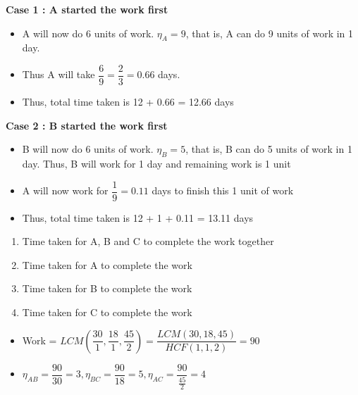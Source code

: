 \begin{multicols}{2}
    
    \textbf{Case 1 : A started the work first}
    \begin{itemize}
        \item A will now do 6 units of work. $\eta_A = 9$, that is, A can do 9 units of work in 1 day. 
        \item Thus A will take $\dfrac{6}{9} = \dfrac{2}{3} = 0.66$ days. 
        \item Thus, total time taken is 12 + 0.66 = 12.66 days
    \end{itemize}
        
    \columnbreak
    
    \textbf{Case 2 : B started the work first}
    \begin{itemize}
        \item B will now do 6 units of work. $\eta_B = 5$, that is, B can do 5 units of work in 1 day. Thus, B will work for 1 day and remaining work is 1 unit
        \item A will now work for $\dfrac{1}{9} = 0.11$ days to finish this 1 unit of work 
        \item Thus, total time taken is 12 + 1 + 0.11 = 13.11 days
    \end{itemize}

\end{multicols}


\begin{enumerate}
    \item Time taken for A, B and C to complete the work together
    \item Time taken for A to complete the work
    \item Time taken for B to complete the work
    \item Time taken for C to complete the work
\end{enumerate}

\vspace{2cm}

\begin{itemize}
    \item Work = $LCM(\dfrac{30}{1}, \dfrac{18}{1}, \dfrac{45}{2}) = \dfrac{LCM(30,18,45)}{HCF(1,1,2)} = 90$
    \item $\eta_{AB} = \dfrac{90}{30} = 3, \eta_{BC} = \dfrac{90}{18} = 5, \eta_{AC} = \dfrac{90}{\frac{45}{2}} = 4$
\end{itemize}

